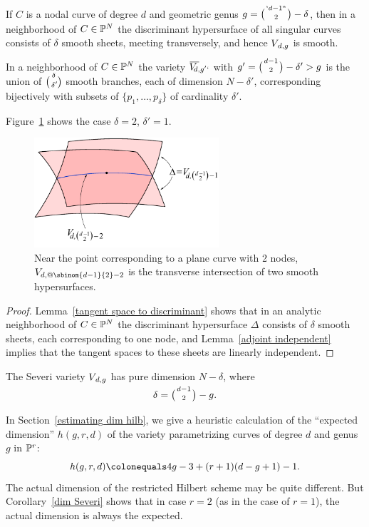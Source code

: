 \begin{corollary}\label{local geometry of Severi}
\hskip-1.6pt
If $C$ is a nodal curve of degree $d$ 
and
geometric genus 
$g =\nobreak \tbinom{`d-1` `}{2}-\nobreak\delta$, then in a neighborhood of $C\in {\mathbb P}^N$
the discriminant hypersurface of all singular curves consists of $\delta$ smooth sheets, meeting transversely, and hence
$V_{\kern1ptd,g}$ is smooth.

In a neighborhood 
of
 $C \in {\mathbb P}^N$
the variety 
$\Vdgpbar$
with $g' =  \tbinom{d-1}{2}-\delta' >g$ 
is the union of $\tbinom{\delta}{\delta'\!}$ smooth branches, each of
dimension $N - \delta'$, corresponding bijectively with subsets of
$\{p_1,\dots,p_{\delta}\}$ of cardinality $\delta'$.
\meshing
\end{corollary}

Figure~\ref{Severi discriminant} shows the case $\delta=2$,  $\delta' = 1$.
\begin{figure}[b]\label{discriminant of a Severi locus}
\centerline {\includegraphics[height=1.6in]{"main/Fig07-3"}}
\vskip-8pt
 \caption{%
Near
the point corresponding to a plane curve with 2 nodes, 
$V_{d,@\protect\sbinom{d-1}{2}-2}$ is the 
transverse
intersection of two smooth hypersurfaces.}
 \label{Severi discriminant}
\end{figure}


\begin{proof}
Lemma~\ref{tangent space to discriminant} shows that in an analytic neighborhood of $C\in {\mathbb P}^N$ the discriminant hypersurface $\Delta$  consists of $\delta$ smooth sheets, each corresponding to one node, and Lemma~\ref{adjoint independent} implies that the tangent spaces to these sheets are linearly independent.
\end{proof}

\begin{corollary}\label{dim Severi}
The  Severi variety $V_{\kern1ptd,g}$ has pure dimension $N - \delta$, where 
$$\delta = \tbinom{d-1}{2} - g.$$
\end{corollary}

In Section~\ref{estimating dim hilb}, we give a heuristic calculation
%
of the ``expected dimension'' $h(g,r,d)$ of the variety parametrizing
curves of degree $d$ and genus $g$ in ${\mathbb P}^r$:
$$
h(g,r,d) \colonequals  4g-3 + (r+1)(d-g+1) - 1.
$$
The actual dimension of the restricted Hilbert scheme may be quite different. But  Corollary~\ref{dim Severi} shows that in case $r=2$ (as in the case of $r=1$), the actual dimension is always the expected.



